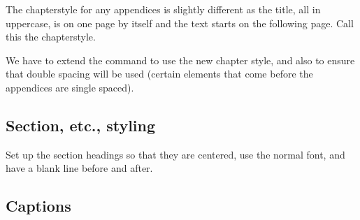    The chapterstyle for any appendices is slightly different as the title,
all in uppercase, is
on one page by itself and the text starts on the following page. Call
this the  chapterstyle.

\begin{lcode}

\end{lcode}

   We have to extend the \cmd{\appendix} command to use the new chapter
style, and also to ensure that double spacing will be used (certain elements
that come before the appendices are single spaced).

\begin{lcode}
\end{lcode}

\subsection{Section, etc., styling}

    Set up the section headings so that they are centered, use the normal
font, and have a blank line before and after.

\begin{lcode}
\setsecheadstyle{\centering\normalfont}
\setsubsecheadstyle{\centering\normalfont}
\end{lcode}


\subsection{Captions}

